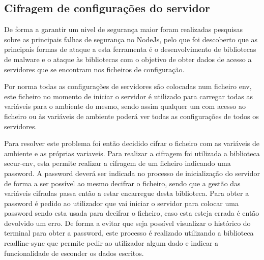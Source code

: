 \subsection{Cifragem de configurações do servidor}
De forma a garantir um nivel de segurança maior foram realizadas pesquisas sobre as principais falhas de segurança no NodeJs, pelo que foi descoberto que as principais formas de ataque a esta ferramenta é o desenvolvimento de bibliotecas de malware e o ataque às bibliotecas com o objetivo de obter dados de acesso a servidores que se encontram nos ficheiros de configuração.

Por norma todas as configurações de servidores são colocadas num ficheiro env, este ficheiro no momento de iniciar o servidor é utilizado para carregar todas as variáveis para o ambiente do mesmo, sendo assim qualquer um com acesso ao ficheiro ou às variáveis de ambiente poderá ver todas as configurações de todos os servidores.

Para resolver este problema foi então decidido cifrar o ficheiro com as variáveis de ambiente e as próprias variaveis. Para realizar a cifragem foi utilizada a biblioteca secur-env, esta permite realizar a cifragem de um ficheiro indicando uma password. A password deverá ser indicada no processo de inicialização do servidor de forma a ser possível ao mesmo decifrar o ficheiro, sendo que a gestão das variáveis cifradas passa então a estar encarregue desta biblioteca. Para obter a password é pedido ao utilizador que vai iniciar o servidor para colocar uma password sendo esta usada para decifrar o ficheiro, caso esta esteja errada é então devolvido um erro. De forma a evitar que seja possível visualizar o histórico do terminal para obter a password, este processo é realizado utilizando a biblioteca readline-sync que permite pedir ao utilizador algum dado e indicar a funcionalidade de esconder os dados escritos.